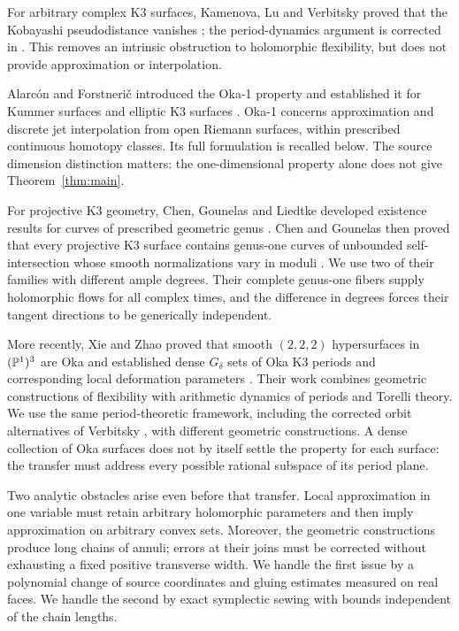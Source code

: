 For arbitrary complex K3 surfaces, Kamenova, Lu and Verbitsky proved
that the Kobayashi pseudodistance vanishes
\cite[Corollary~2.2]{KamenovaLuVerbitsky}; the period-dynamics argument
is corrected in \cite[Section~4]{VerbitskyErratum}. This removes an
intrinsic obstruction to holomorphic flexibility, but does not
provide approximation or interpolation.

Alarc\'on and Forstneri\v c introduced the Oka-1 property and established
it for Kummer surfaces and elliptic K3 surfaces
\cite[Proposition~8.4 and Corollary~8.6]{AlarconForstneric}.
Oka-1 concerns approximation and discrete jet interpolation from open
Riemann surfaces, within prescribed continuous homotopy classes. Its
full formulation is recalled below.
The source dimension distinction matters: the one-dimensional
property alone does not give Theorem~\ref{thm:main}.

For projective K3 geometry, Chen, Gounelas and Liedtke developed
existence results for curves of prescribed geometric genus
\cite{ChenGounelasLiedtke}. Chen and Gounelas then proved that every
projective K3 surface contains genus-one curves of unbounded
self-intersection whose smooth normalizations vary in moduli
\cite[Theorem~A]{ChenGounelas}. We use two of their families with
different ample degrees. Their complete genus-one fibers supply
holomorphic flows for all complex times, and the difference in degrees
forces their tangent directions to be generically independent.

More recently, Xie and Zhao proved that smooth $(2,2,2)$ hypersurfaces
in $(\mathbb P^1)^3$ are Oka and established dense $G_\delta$ sets of Oka
K3 periods and corresponding local deformation parameters
\cite[Theorems~A, B, and~E]{XieZhao}. Their work combines geometric
constructions of flexibility with arithmetic dynamics of periods and
Torelli theory. We use the same period-theoretic framework, including
the corrected orbit alternatives of Verbitsky
\cite{VerbitskyErratum}, with different geometric constructions.
A dense collection of Oka surfaces does not by itself settle the
property for each surface: the transfer must address every possible
rational subspace of its period plane.

Two analytic obstacles arise even before that transfer. Local
approximation in one variable must retain arbitrary holomorphic
parameters and then imply approximation on arbitrary convex sets.
Moreover, the geometric constructions produce long chains of annuli;
errors at their joins must be corrected without exhausting a fixed
positive transverse width. We handle the first issue by a polynomial
change of source coordinates and gluing estimates measured on real
faces. We handle the second by exact symplectic sewing with bounds
independent of the chain lengths.

